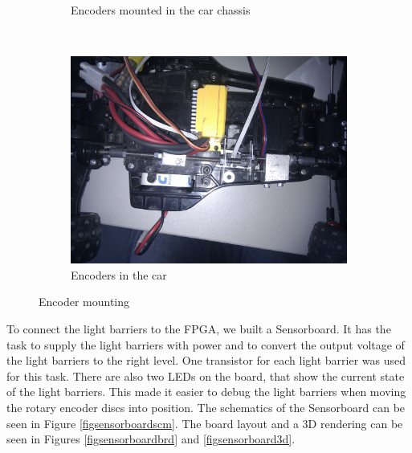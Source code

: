 \documentclass[a4paper
               ,10pt
               ,DIV=10 %
               ,BCOR=0.3cm
               ,pagesize %
               ,headings=small
               ,bibtotoc
               ]
               {scrartcl}
\begin{document}
\begin{figure}[H]
\begin{subfigure}[b]{0.3\textwidth}
  \caption{Encoders mounted in the car chassis}
  \label{figencmount2}
  \end{subfigure}~
  \begin{subfigure}[b]{0.3\textwidth}
  \centering
  \includegraphics[width=\textwidth]{pic/encoders_top.jpg}
  \caption{Encoders in the car}
  \label{figencmount3}
  \end{subfigure}
  \caption{Encoder mounting}
  \label{figenc}
\end{figure}


To connect the light barriers to the FPGA, we built a Sensorboard. It has the task to supply the light barriers with power and to convert the output voltage of the light barriers to the right level.
One transistor for each light barrier was used for this task.
There are also two LEDs on the board, that show the current state of the light barriers.
This made it easier to debug the light barriers when moving the rotary encoder discs into position.
The schematics of the Sensorboard can be seen in Figure \ref{figsensorboardscm}. The board layout and a 3D rendering can be seen in Figures \ref{figsensorboardbrd} and \ref{figsensorboard3d}.
\end{document}
